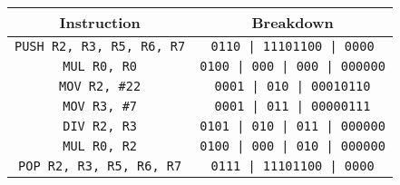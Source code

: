 \begin{tabular}{cc}
    \toprule
    \textbf{Instruction}
     &
    \textbf{Breakdown}
    \\
    \midrule
    \texttt{PUSH R2, R3, R5, R6, R7}
     &
    \texttt{0110 | 11101100 | 0000}
    \\
    \midrule
    \texttt{MUL R0, R0}
     &
    \texttt{0100 | 000 | 000 | 000000}
    \\
    \midrule
    \texttt{MOV R2, \#22}
     &
    \texttt{0001 | 010 | 00010110}
    \\
    \midrule
    \texttt{MOV R3, \#7}
     & \texttt{0001 | 011 | 00000111}
    \\
    \midrule
    \texttt{DIV R2, R3}
     & \texttt{0101 | 010 | 011 | 000000}
    \\
    \midrule
    \texttt{MUL R0, R2}
     & \texttt{0100 | 000 | 010 | 000000}
    \\
    \midrule
    \texttt{POP R2, R3, R5, R6, R7}
     & \texttt{0111 | 11101100 | 0000}
    \\
    \bottomrule
\end{tabular}
